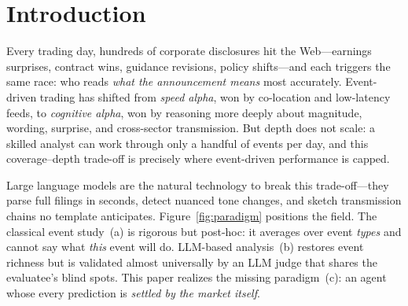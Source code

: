 \documentclass[sigconf, anonymous, review]{acmart}
\begin{document}
\begin{teaserfigure}
\caption{Three paradigms of event-driven financial analysis. (a)~Event studies average CAR by event type---rigorous but post-hoc. (b)~LLM analysis restores event richness but is validated by a judge sharing the evaluatee's blind spots. (c)~PRONOIA structures each event, propagates it over an economic graph, and lets post-event market data settle every claim---closing the reason--verify--revise loop.}
\label{fig:paradigm}
\end{teaserfigure}

\maketitle

\section{Introduction}
\label{sec:intro}

Every trading day, hundreds of corporate disclosures hit the Web---earnings surprises, contract wins, guidance revisions, policy shifts---and each triggers the same race: who reads \emph{what the announcement means} most accurately. Event-driven trading has shifted from \emph{speed alpha}, won by co-location and low-latency feeds, to \emph{cognitive alpha}, won by reasoning more deeply about magnitude, wording, surprise, and cross-sector transmission. But depth does not scale: a skilled analyst can work through only a handful of events per day, and this coverage--depth trade-off is precisely where event-driven performance is capped.

Large language models are the natural technology to break this trade-off---they parse full filings in seconds, detect nuanced tone changes, and sketch transmission chains no template anticipates. Figure~\ref{fig:paradigm} positions the field. The classical event study~(a) is rigorous but post-hoc: it averages over event \emph{types} and cannot say what \emph{this} event will do. LLM-based analysis~(b) restores event richness but is validated almost universally by an LLM judge that shares the evaluatee's blind spots. This paper realizes the missing paradigm~(c): an agent whose every prediction is \emph{settled by the market itself}.
\end{document}
